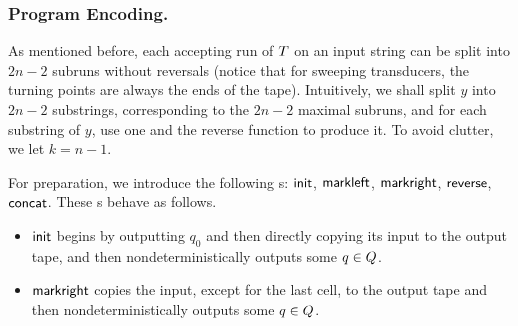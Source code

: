 {\subsubsection{Program Encoding.}

As mentioned before, each accepting run of $T$ on an input string can be split into $2n-2$
subruns without reversals (notice that for sweeping transducers,  the turning points are always the ends of the tape).
%
Intuitively, we shall split $y$ into $2n-2$ substrings, corresponding to the
$2n-2$ maximal subruns, and for each substring of $y$, use one \PT{} and the
reverse function to produce it. To avoid clutter, we let $k=n-1$. 



For preparation, we introduce the following \FT{}s:
$\mathsf{init}$,
$\mathsf{markleft}$,
$\mathsf{markright}$,
$\mathsf{reverse}$,
$\mathsf{concat}$.
These \FT{}s behave as follows.
\begin{itemize}
	\item
	$\mathsf{init}$ begins by outputting $q_0$ and then directly copying its input to
	the output tape, and then nondeterministically  outputs some $q\in Q$. 
	
	\item
	$\mathsf{markright}$ copies the input, except for the last cell, to the output tape and then nondeterministically  outputs some $q\in Q$.  
	

\end{itemize}}
